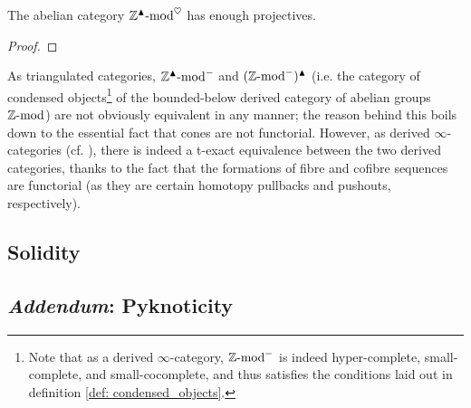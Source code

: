             \begin{theorem} \label{theorem: the_large_category_of_condensed_abelian_groups_has_enough_projectives}
                The abelian category $\mathbb{Z}^{\blacktriangle}\text{-}\mathrm{mod}^{\heartsuit}$ has enough projectives.
            \end{theorem}
                \begin{proof}
                    
                \end{proof}
            \begin{definition} \label{def: the_derived_category_of_abelian_groups}
                
            \end{definition}
            \begin{remark} \label{remark: condensation_of_the_derived_category_of_abelian_groups}
                As triangulated categories, $\mathbb{Z}^{\blacktriangle}\text{-}\mathrm{mod}^-$ and $(\mathbb{Z}\text{-}\mathrm{mod}^-)^{\blacktriangle}$ (i.e. the category of condensed objects\footnote{Note that as a derived $\infty$-category, $\mathbb{Z}\text{-}\mathrm{mod}^-$ is indeed hyper-complete, small-complete, and small-cocomplete, and thus satisfies the conditions laid out in definition \ref{def: condensed_objects}.} of the bounded-below derived category of abelian groups $\mathbb{Z}\text{-}\mathrm{mod}$) are not obviously equivalent in any manner; the reason behind this boils down to the essential fact that cones are not functorial. However, as derived $\infty$-categories (cf. \cite[Subsection 1.3.2]{HA}), there is indeed a t-exact equivalence between the two derived categories, thanks to the fact that the formations of fibre and cofibre sequences are functorial (as they are certain homotopy pullbacks and pushouts, respectively).
            \end{remark}
        
    \subsection{Solidity}
    
    \subsection{\textit{Addendum}: Pyknoticity}
